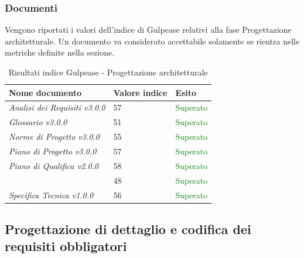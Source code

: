 	 	\subsubsection{Documenti}	 	
	 	Vengono riportati i valori dell'indice di Gulpease relativi alla fase Progettazione architetturale. Un documento va considerato accettabile solamente se rientra nelle metriche definite nella sezione.
		\begin{table}[!ht]
			\begin{center}
				\begin{tabularx}{0.9\textwidth}{|l|l|X|}
					\hline
					\textbf{Nome documento} & \textbf{Valore indice} & \textbf{Esito}\\
					\hline						
					\emph{Analisi dei Requisiti v3.0.0} & 57 & \textcolor{green}{Superato}\\
					\hline
					\emph{Glossario v3.0.0} & 51 & \textcolor{green}{Superato}\\
					\hline					
					\emph{Norme di Progetto v3.0.0} & 55 & \textcolor{green}{Superato}\\
					\hline					
					\emph{Piano di Progetto v3.0.0} & 57 & \textcolor{green}{Superato}\\
					\hline					
					\emph{Piano di Qualifica v2.0.0} & 58 & \textcolor{green}{Superato}\\
					\hline					
					\docNameVersionSdF & 48 & \textcolor{green}{Superato}\\
					\hline	
					\emph{Specifica Tecnica v1.0.0}  & 56 & \textcolor{green}{Superato}\\
					\hline			
				\end{tabularx}
			\end{center}
			\caption{Risultati indice Gulpease - Progettazione architetturale}
		\end{table}
		
	\subsection{Progettazione di dettaglio e codifica dei requisiti obbligatori}

